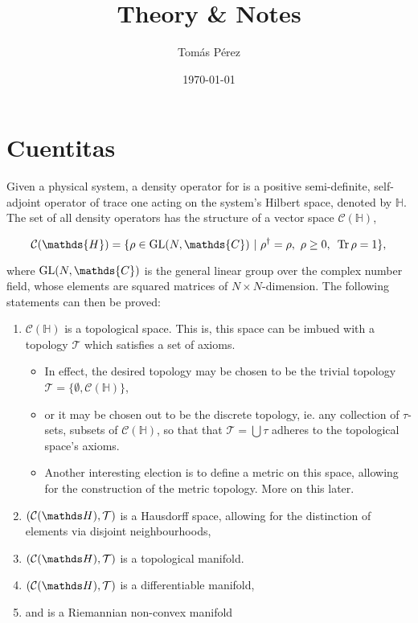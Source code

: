 \documentclass{homework}
\author{Tomás Pérez}
\date{\today}
\title{Theory \& Notes}
\begin{document}
 \maketitle

\section{Cuentitas}

Given a physical system, a density operator for is a positive semi-definite, self-adjoint operator of trace one acting on the system's Hilbert space, denoted by $\mathds{H}$. The set of all density operators has the structure of a vector space $\mathcal{C}(\mathds{H})$,

$$
\mathcal{C}(\mathds{H}) = \{ \rho \in \textnormal{GL}(N, \mathds{C}) \blanky | \blanky \rho^\dagger = \rho, \blanky \rho \geq 0, \blanky \Tr \rho = 1 \},
$$

where $\textnormal{GL}(N, \mathds{C})$ is the general linear group over the complex number field, whose elements are squared matrices of $N \times N$-dimension. The following statements can then be proved:

\begin{enumerate}
    \item $\mathcal{C}(\mathds{H})$ is a topological space. This is, this space can be imbued with a topology $\mathcal{T}$ which satisfies a set of axioms. 
    \begin{itemize}
        \item In effect, the desired topology may be chosen to be the trivial topology $\mathcal{T} = \{\emptyset, \mathcal{C}(\mathds{H})\}$,
        \item or it may be chosen out to be the discrete topology, ie. any collection of $\tau$-sets, subsets of $\mathcal{C}(\mathds{H})$, so that that $\mathcal{T} = \bigcup \tau$ adheres to the topological space's axioms. 
        \item Another interesting election is to define a metric on this space, allowing for the construction of the metric topology. More on this later.   
    \end{itemize}
    \item $\topospace$ is a Hausdorff space, allowing for the distinction of elements via disjoint neighbourhoods, 
    \item $\topospace$ is a topological manifold. \item $\topospace$ is a differentiable manifold,
    \item and is a Riemannian non-convex manifold
\end{enumerate}
\end{document}
